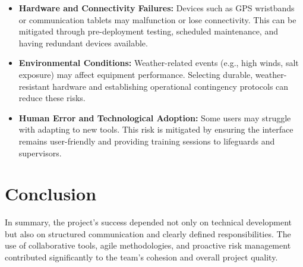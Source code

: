 \begin{itemize}
    \item \textbf{Hardware and Connectivity Failures:} Devices such as GPS wristbands or communication tablets may malfunction or lose connectivity. This can be mitigated through pre-deployment testing, scheduled maintenance, and having redundant devices available.

    \item \textbf{Environmental Conditions:} Weather-related events (e.g., high winds, salt exposure) may affect equipment performance. Selecting durable, weather-resistant hardware and establishing operational contingency protocols can reduce these risks.

    \item \textbf{Human Error and Technological Adoption:} Some users may struggle with adapting to new tools. This risk is mitigated by ensuring the interface remains user-friendly and providing training sessions to lifeguards and supervisors.
\end{itemize}

\section{Conclusion}
In summary, the project's success depended not only on technical development but also on structured communication and clearly defined responsibilities. The use of collaborative tools, agile methodologies, and proactive risk management contributed significantly to the team's cohesion and overall project quality.










%